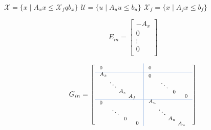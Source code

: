 \begin{minipage}[c]{0.5\linewidth}
	$\mathcal{X} = \{x \mid A_x x \le \mathcal{X}_fq b_x\}$
	$\mathcal{U}   = \{u \mid A_u u \leq b_u\}$
	$\mathcal{X}_f = \{x \mid A_f x \leq b_f\}$
\end{minipage}
\begin{minipage}[b]{0.4\linewidth}
	\[E_{in} =
		\left[
			\begin{smallmatrix}
				-A_x \\
				0 \\
				\vdots \\
				0 \\
			\end{smallmatrix}
			\right]\]
\end{minipage}
\[
	G_{in} =
	\left[
		\begin{array}{l!{\color{RoyalBlue!50}\vrule}l}
			\noalign{\arrayrulewidth=0.1mm}\arrayrulecolor{RoyalBlue!50}
			\begin{smallmatrix}
				0&&&
			\end{smallmatrix}
			 &
			\begin{smallmatrix}
				0&&&
			\end{smallmatrix}
			\\ \hline
			\begin{smallmatrix}
				A_x&&&\\
				&\ddots&\\
				&&		A_x&\\
				&&&		A_f
			\end{smallmatrix}
			 &
			\begin{smallmatrix}
				0\ \ &&&\\
				&\ \ddots\\
				&&\ 0\ &\\
				&&&\ \ 0
			\end{smallmatrix}
			\\ \hline
			\begin{smallmatrix}
				0\ \ &&&\\
				&\ \ddots\\
				&&\ 0\ &\\
				&&&\ \ 0
			\end{smallmatrix}
			 &
			\begin{smallmatrix}
				A_u&&\\
				&\ddots&\\
				&&A_u&\\
				&&&A_u
			\end{smallmatrix}
		\end{array}
		\right]
\]

